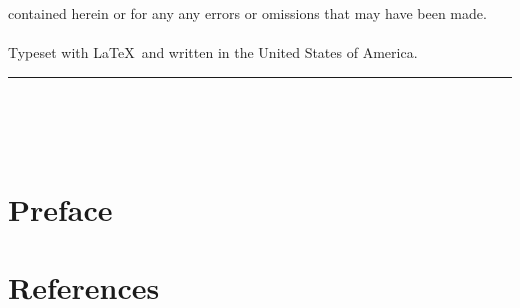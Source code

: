 \documentclass[
  letterpaper,
  10pt,
  reqno,
  twopage,
  openany]{book}
\newlength{\cslhangindent}
\newlength{\cslentryspacingunit} %
\newenvironment{CSLReferences}[2] %
 {%
  \setlength{\parindent}{0pt}
  \ifodd #1
  \let\oldpar\par
  \def\par{\hangindent=\cslhangindent\oldpar}
  \fi
  \setlength{\parskip}{#2\cslentryspacingunit}
 }%
 {}
\newcommand{\HRule}{\rule{\linewidth}{0.5mm}}
\begin{document}
\begin{titlepage}
contained herein or for any any errors or omissions that may have been made.  \\ \\  
Typeset with \LaTeX \, and written in the United States of America.  
\\[2pt] \HRule \\[0.5cm]  \authname \\ \cred \\ \website
\end{titlepage}



\ifdefined\Shaded\renewenvironment{Shaded}{\begin{tcolorbox}[interior hidden, borderline west={3pt}{0pt}{shadecolor}, breakable, boxrule=0pt, enhanced, frame hidden, sharp corners]}{\end{tcolorbox}}\fi

\mainmatter
{}

\hypertarget{preface}{%
\chapter*{Preface}\label{preface}}



\hypertarget{references}{%
\chapter*{References}\label{references}}


\hypertarget{refs}{}
\begin{CSLReferences}{0}{0}
\end{CSLReferences}


\backmatter


\printindex
\end{document}
